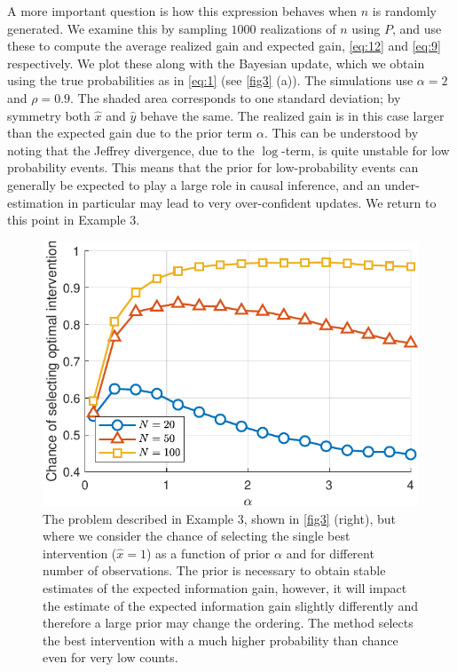 \documentclass[letterpaper]{article} %
\begin{document}
A more important question is how this expression behaves when $n$ is randomly generated. We examine this by sampling $1000$ realizations of $n$ using $P$, and use these to compute the average realized gain and expected gain, \cref{eq:12} and \cref{eq:9} respectively.  We plot these along with the Bayesian update, which we obtain using the true probabilities as in \cref{eq:1} (see \cref{fig3} (a)). The simulations use $\alpha = 2$ and $\rho = 0.9$. The shaded area corresponds to one standard deviation; by symmetry both $\hat x$ and $\hat y$ behave the same. The realized gain is in this case larger than the expected gain due to the prior term $\alpha$. This can be understood by noting that the Jeffrey divergence, due to the $\log$-term, is quite unstable for low probability events. This means that the prior for low-probability events can generally be expected to play a large role in causal inference, and an under-estimation in particular may lead to very over-confident updates. We return to this point in Example 3.

\begin{figure}[t!]
\centering
\includegraphics[width=.8\linewidth]{alpha-crop}
\caption{The problem described in Example 3, shown in \cref{fig3} (right), but where we consider the chance of selecting the single best intervention ($\hat x=1$) as a function of prior $\alpha$ and for different number of observations. The prior is necessary to obtain stable estimates of the expected information gain, however, it will impact the estimate of the expected information gain slightly differently and therefore a large prior may change the ordering. The method selects the best intervention with a much higher probability than chance even for very low counts. }\label{fig4}
\end{figure}
\end{document}
